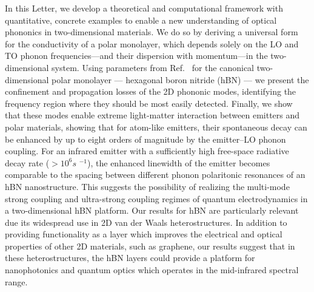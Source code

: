\documentclass[aps,prb,twocolumn,
	           groupedaddress,superscriptaddress,
               amsfonts,amssymb,amsmath,floatfix,
	           citeautoscript]{revtex4-1}
\begin{document}
In this Letter, we develop a theoretical and computational framework with quantitative, concrete examples to enable a new understanding of optical phononics in two-dimensional materials. We do so by deriving a universal form for the conductivity of a polar monolayer,  which depends solely on the LO and TO phonon frequencies---and their dispersion with momentum---in the two-dimensional system. Using parameters from Ref.~ for the canonical two-dimensional polar monolayer --- hexagonal boron nitride (hBN) --- we present the confinement and propagation losses of the 2D phononic modes, identifying the frequency region where they should be most easily detected. Finally, we show that these modes enable extreme light-matter interaction between emitters and polar materials, showing that for atom-like emitters, their spontaneous decay can be enhanced by up to eight orders of magnitude by the emitter--LO phonon coupling. For an infrared emitter with a sufficiently high free-space radiative decay rate ($> 10^6 s$ $^{-1}$), the enhanced linewidth of the emitter becomes comparable to the spacing between different phonon polaritonic resonances of an hBN nanostructure. This suggests the possibility of realizing the multi-mode strong coupling and ultra-strong coupling regimes of quantum electrodynamics in a two-dimensional hBN platform. Our results for hBN are particularly relevant due its widespread use in 2D van der Waals heterostructures. In addition to providing functionality as a layer which improves the electrical and optical properties of other 2D materials, such as graphene, our results suggest that in these heterostructures, the hBN layers could provide a platform for nanophotonics and quantum optics which operates in the mid-infrared spectral range. 
\end{document}
